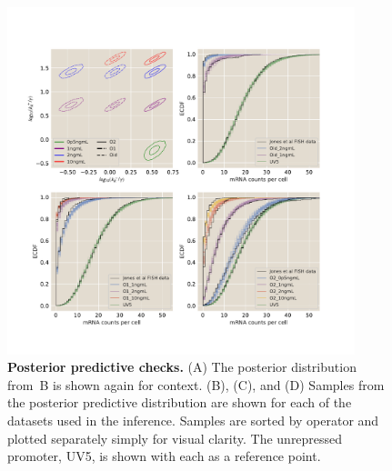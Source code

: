 \begin{figure}%
\centering
\includegraphics[width=0.9\textwidth]{../figures/figSIxx/ppc_many_pooled.pdf}
\caption{\textbf{Posterior predictive checks.}
(A) The posterior distribution from~B is
shown again for context. (B), (C), and (D) Samples from the
posterior predictive distribution are shown for each of the datasets
used in the inference. Samples are sorted by operator and plotted separately
simply for visual clarity. The unrepressed promoter, UV5, is shown with each as
a reference point. }
\label{fig4:ppc}
\end{figure}